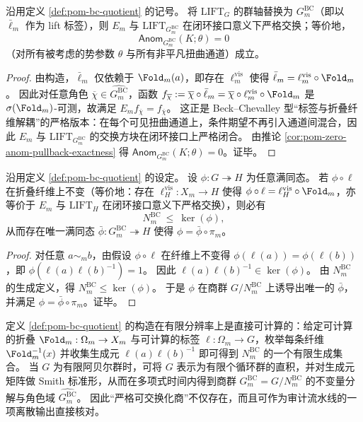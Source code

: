 \begin{proposition}\label{prop:pom-bc-quotient-strictify}
沿用定义 \ref{def:pom-bc-quotient} 的记号。
将 \(\mathrm{LIFT}_G\) 的群轴替换为 \(G^{\mathrm{BC}}_m\)（即以 \(\bar\ell_m\) 作为 lift 标签），则 \(E_m\) 与 \(\mathrm{LIFT}_{G^{\mathrm{BC}}_m}\) 在闭环接口意义下严格交换；等价地，
\[
\mathsf{Anom}_{G^{\mathrm{BC}}_m}(K;\theta)=0
\]
（对所有被考虑的势参数 \(\theta\) 与所有非平凡扭曲通道）成立。
\end{proposition}
\begin{proof}
由构造，\(\bar\ell_m\) 仅依赖于 \(\Fold_m(a)\)，即存在 \(\ell^{\mathrm{vis}}_m\) 使得 \(\bar\ell_m=\ell^{\mathrm{vis}}_m\circ \Fold_m\)。
因此对任意角色 \(\overline\chi\in\widehat{G^{\mathrm{BC}}_m}\)，函数
\(
f_{\overline\chi}:=\overline\chi\circ \bar\ell_m
=
\overline\chi\circ \ell^{\mathrm{vis}}_m\circ \Fold_m
\)
是 \(\sigma(\Fold_m)\)-可测，故满足 \(E_m f_{\overline\chi}=f_{\overline\chi}\)。
这正是 Beck--Chevalley 型“标签与折叠纤维解耦”的严格版本：在每个可见扭曲通道上，条件期望不再引入通道间混合，因此 \(E_m\) 与 \(\mathrm{LIFT}_{G^{\mathrm{BC}}_m}\) 的交换方块在闭环接口上严格闭合。
由推论 \ref{cor:pom-zero-anom-pullback-exactness} 得 \(\mathsf{Anom}_{G^{\mathrm{BC}}_m}(K;\theta)=0\)。证毕。
\end{proof}

\begin{proposition}\label{prop:pom-bc-quotient-universal}
沿用定义 \ref{def:pom-bc-quotient} 的设定。
设 \(\phi:G\twoheadrightarrow H\) 为任意满同态。
若 \(\phi\circ \ell\) 在折叠纤维上不变（等价地：存在 \(\ell_H^{\mathrm{vis}}:X_m\to H\) 使得 \(\phi\circ\ell=\ell_H^{\mathrm{vis}}\circ\Fold_m\)，亦等价于 \(E_m\) 与 \(\mathrm{LIFT}_H\) 在闭环接口意义下严格交换），则必有
\[
N^{\mathrm{BC}}_m\ \le\ \ker(\phi),
\]
从而存在唯一满同态 \(\bar\phi:G^{\mathrm{BC}}_m\twoheadrightarrow H\) 使得 \(\phi=\bar\phi\circ \pi_m\)。
\end{proposition}
\begin{proof}
对任意 \(a\sim_m b\)，由假设 \(\phi\circ\ell\) 在纤维上不变得 \(\phi(\ell(a))=\phi(\ell(b))\)，即 \(\phi(\ell(a)\ell(b)^{-1})=1\)。
因此 \(\ell(a)\ell(b)^{-1}\in\ker(\phi)\)。
由 \(N^{\mathrm{BC}}_m\) 的生成定义，得 \(N^{\mathrm{BC}}_m\le \ker(\phi)\)。
于是 \(\phi\) 在商群 \(G/N^{\mathrm{BC}}_m\) 上诱导出唯一的 \(\bar\phi\)，并满足 \(\phi=\bar\phi\circ\pi_m\)。证毕。
\end{proof}

\begin{remark}\label{rem:pom-bc-quotient-computable}
定义 \ref{def:pom-bc-quotient} 的构造在有限分辨率上是直接可计算的：给定可计算的折叠 \(\Fold_m:\Omega_m\to X_m\) 与可计算的标签 \(\ell:\Omega_m\to G\)，枚举每条纤维 \(\Fold_m^{-1}(x)\) 并收集生成元
\(
\ell(a)\ell(b)^{-1}
\)
即可得到 \(N^{\mathrm{BC}}_m\) 的一个有限生成集合。
当 \(G\) 为有限阿贝尔群时，可将 \(G\) 表示为有限个循环群的直积，并对生成元矩阵做 Smith 标准形，从而在多项式时间内得到商群 \(G^{\mathrm{BC}}_m=G/N^{\mathrm{BC}}_m\) 的不变量分解与角色域 \(\widehat{G^{\mathrm{BC}}_m}\)。
因此“严格可交换化商”不仅存在，而且可作为审计流水线的一项离散输出直接核对。
\end{remark}

